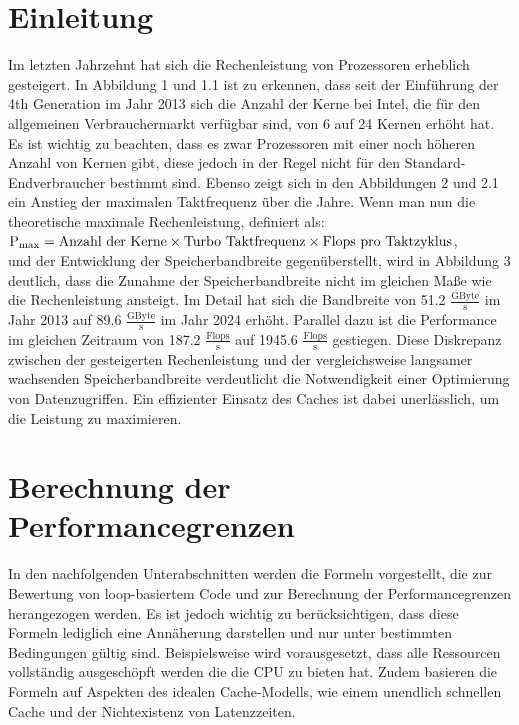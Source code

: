 \documentclass[sigconf,language=english]{acmart}
\begin{document}
\section{Einleitung}
    Im letzten Jahrzehnt hat sich die Rechenleistung von Prozessoren erheblich gesteigert. 
    In Abbildung 1 und 1.1 ist zu erkennen, dass seit der Einführung der 4th Generation im Jahr 2013 sich die Anzahl der Kerne bei Intel, 
    die für den allgemeinen Verbrauchermarkt verfügbar sind, von 6 auf 24 Kernen erhöht hat.
    Es ist wichtig zu beachten, dass es zwar Prozessoren mit einer noch höheren Anzahl von Kernen gibt, 
    diese jedoch in der Regel nicht für den Standard-Endverbraucher bestimmt sind. 
    Ebenso zeigt sich in den Abbildungen 2 und 2.1 ein Anstieg der maximalen Taktfrequenz über die Jahre. 
    Wenn man nun die theoretische maximale Rechenleistung, 
    definiert als:\\ $\textnormal{P}_{\textnormal{max}} = \text{Anzahl der Kerne} \times \text{Turbo Taktfrequenz} \times \text{Flops pro Taktzyklus}$,\\und
    der Entwicklung der Speicherbandbreite gegenüberstellt, wird in Abbildung 3 deutlich, 
    dass die Zunahme der Speicherbandbreite nicht im gleichen Maße wie die Rechenleistung ansteigt. 
    Im Detail hat sich die Bandbreite von 51.2 $\frac{\text{GByte}}{\text{s}}$ im Jahr 2013 auf 89.6 $\frac{\text{GByte}}{\text{s}}$ im Jahr 2024 erhöht. 
    Parallel dazu ist die Performance im gleichen Zeitraum von 187.2 $\frac{\text{Flops}}{\text{s}}$ auf 1945.6 $\frac{\text{Flops}}{\text{s}}$ gestiegen. 
    Diese Diskrepanz zwischen der gesteigerten Rechenleistung und der vergleichsweise langsamer wachsenden Speicherbandbreite 
    verdeutlicht die Notwendigkeit einer Optimierung von Datenzugriffen. 
    Ein effizienter Einsatz des Caches ist dabei unerlässlich, um die Leistung zu maximieren.

    \section{Berechnung der Performancegrenzen}
    In den nachfolgenden Unterabschnitten werden die Formeln vorgestellt, 
    die zur Bewertung von loop-basiertem Code und zur Berechnung der Performancegrenzen herangezogen werden. 
    Es ist jedoch wichtig zu berücksichtigen, dass diese Formeln lediglich eine Annäherung darstellen 
    und nur unter bestimmten Bedingungen gültig sind. Beispielsweise wird vorausgesetzt, 
    dass alle Ressourcen vollständig ausgeschöpft werden die die CPU zu bieten hat. 
    Zudem basieren die Formeln auf Aspekten des idealen Cache-Modells, 
    wie einem unendlich schnellen Cache und der Nichtexistenz von Latenzzeiten.
\end{document}
